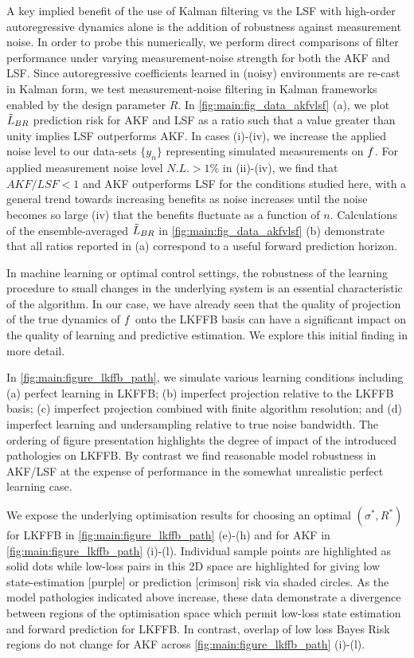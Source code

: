 A key implied benefit of the use of Kalman filtering vs the LSF with high-order autoregressive dynamics alone is the addition of robustness against measurement noise.  In order to probe this numerically, we perform direct comparisons of filter performance under varying measurement-noise strength for both the AKF and LSF.  Since autoregressive coefficients learned in (noisy) environments are re-cast in Kalman form, we test measurement-noise filtering in Kalman frameworks enabled by the design parameter $R$. In \cref{fig:main:fig_data_akfvlsf} (a), we plot $\tilde{L}_{BR}$ prediction risk for AKF and LSF as a ratio such that a value greater than unity implies LSF outperforms AKF. In cases (i)-(iv), we increase the applied noise level to our data-sets $\{ y_n \}$ representing simulated measurements on $f$. For applied measurement noise level $N.L. > 1\%$ in (ii)-(iv), we find that $AKF/LSF <1 $ and AKF outperforms LSF for the conditions studied here, with a general trend towards increasing benefits as noise increases until the noise becomes so large (iv) that the benefits fluctuate as a function of $n$. Calculations of the ensemble-averaged $\tilde{L}_{BR}$ in \cref{fig:main:fig_data_akfvlsf} (b) demonstrate that all ratios reported in (a) correspond to a useful forward prediction horizon. 


In machine learning or optimal control settings, the robustness of the learning procedure to small changes in the underlying system is an essential characteristic of the algorithm.  In our case, we have already seen that the quality of projection of the true dynamics of $f$ onto the LKFFB basis can have a significant impact on the quality of learning and predictive estimation.  We explore this initial finding in more detail.  

In \cref{fig:main:figure_lkffb_path}, we simulate various learning conditions including (a) perfect learning in LKFFB; (b) imperfect projection relative to the LKFFB basis; (c) imperfect projection combined with finite algorithm resolution; and (d) imperfect learning and undersampling relative to true noise bandwidth. The ordering of figure presentation highlights the degree of impact of the introduced pathologies on LKFFB.  By contrast we find reasonable model robustness in AKF/LSF at the expense of performance in the somewhat unrealistic perfect learning case.  

We expose the underlying optimisation results for choosing an optimal $(\sigma^*, R^*)$ for LKFFB in \cref{fig:main:figure_lkffb_path} (e)-(h) and for AKF in \cref{fig:main:figure_lkffb_path} (i)-(l). Individual sample points are highlighted as solid dots while low-loss pairs in this 2D space are highlighted for giving low state-estimation [purple] or prediction [crimson] risk via shaded circles.  As the model pathologies indicated above increase, these data demonstrate a divergence between regions of the optimisation space which permit low-loss state estimation and forward prediction for LKFFB.  In contrast, overlap of low loss Bayes Risk regions do not change for AKF across \cref{fig:main:figure_lkffb_path} (i)-(l).

